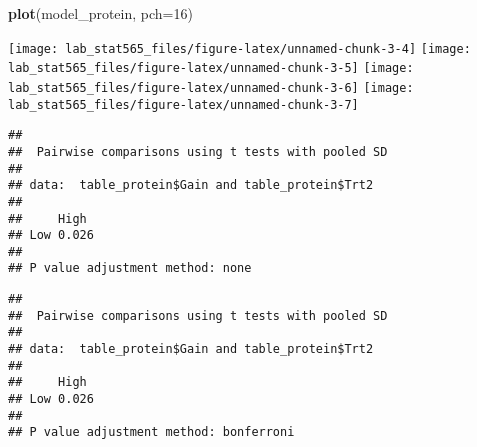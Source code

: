 \documentclass[]{article}
\newenvironment{Shaded}{\begin{snugshade}}{\end{snugshade}}
\newcommand{\CommentTok}[1]{\textcolor[rgb]{0.56,0.35,0.01}{\textit{#1}}}
\newcommand{\DataTypeTok}[1]{\textcolor[rgb]{0.13,0.29,0.53}{#1}}
\newcommand{\DecValTok}[1]{\textcolor[rgb]{0.00,0.00,0.81}{#1}}
\newcommand{\KeywordTok}[1]{\textcolor[rgb]{0.13,0.29,0.53}{\textbf{#1}}}
\newcommand{\NormalTok}[1]{#1}
\newcommand{\OperatorTok}[1]{\textcolor[rgb]{0.81,0.36,0.00}{\textbf{#1}}}
\newcommand{\StringTok}[1]{\textcolor[rgb]{0.31,0.60,0.02}{#1}}
\begin{document}
\begin{Shaded}
\begin{Highlighting}[]
\KeywordTok{plot}\NormalTok{(model_protein, }\DataTypeTok{pch=}\DecValTok{16}\NormalTok{)}
\end{Highlighting}
\end{Shaded}

\texttt{[image: lab\_stat565\_files/figure-latex/unnamed-chunk-3-4]}
\texttt{[image: lab\_stat565\_files/figure-latex/unnamed-chunk-3-5]}
\texttt{[image: lab\_stat565\_files/figure-latex/unnamed-chunk-3-6]}
\texttt{[image: lab\_stat565\_files/figure-latex/unnamed-chunk-3-7]}

\begin{Shaded}
\end{Shaded}

\begin{verbatim}
## 
##  Pairwise comparisons using t tests with pooled SD 
## 
## data:  table_protein$Gain and table_protein$Trt2 
## 
##     High 
## Low 0.026
## 
## P value adjustment method: none
\end{verbatim}

\begin{Shaded}
\end{Shaded}

\begin{verbatim}
## 
##  Pairwise comparisons using t tests with pooled SD 
## 
## data:  table_protein$Gain and table_protein$Trt2 
## 
##     High 
## Low 0.026
## 
## P value adjustment method: bonferroni
\end{verbatim}
\end{document}
